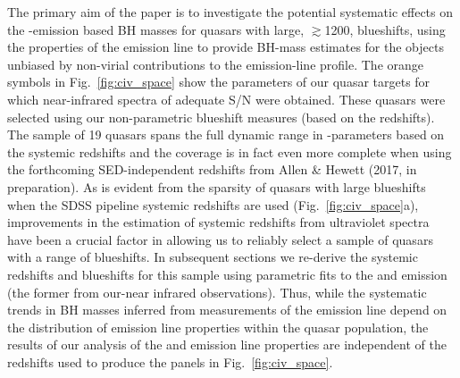 The primary aim of the paper is to investigate the potential systematic effects on the -emission based BH masses for quasars with large, $\gtrsim$1200\kms,  blueshifts, using the properties of the \ha emission line to provide BH-mass estimates for the objects unbiased by non-virial contributions to the emission-line profile.
The orange symbols in Fig.~\ref{fig:civ_space} show the  parameters of our quasar targets for which near-infrared spectra of adequate S/N were obtained. 
These quasars were selected using our non-parametric blueshift measures (based on the \citet{hewett10} redshifts). 
The sample of 19 quasars spans the full dynamic range in -parameters based on the \citet{hewett10} systemic redshifts and the coverage is in fact even more complete when using the forthcoming SED-independent redshifts from Allen \& Hewett (2017, in preparation).
As is evident from the sparsity of quasars with large  blueshifts when the SDSS pipeline systemic redshifts are used (Fig.~\ref{fig:civ_space}a), improvements in the estimation of systemic redshifts from ultraviolet spectra have been a crucial factor in allowing us to reliably select a sample of quasars with a range of  blueshifts. 
In subsequent sections we re-derive the systemic redshifts and  blueshifts for this sample using parametric fits to the \ha and  emission (the former from our-near infrared observations). 
Thus, while the systematic trends in BH masses inferred from measurements of the  emission line depend on the distribution of  emission line properties within the quasar population, the results of our analysis of the \ha and  emission line properties are independent of the redshifts used to produce the panels in Fig.~\ref{fig:civ_space}.  